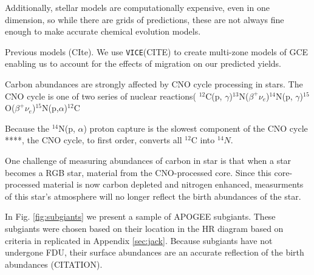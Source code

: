 \documentclass[fleqn,usenatbib]{mnras}
\newcommand{\VICE}{\texttt{VICE}}
\begin{document}
Additionally, stellar models are computationally expensive, even in one dimension, so while there are grids of predictions, these are not always fine enough to make accurate chemical evolution models. 

Previous models (CIte). We use \VICE (CITE) to create multi-zone models of GCE enabling us to account for the effects of migration on our predicted yields. 

\citet{prantzos+18}
\citep{WAF17}
\citep{james+21}
\citep{fiorenzo+21}


\citep[e.g.][]{james+22}

Carbon abundances are strongly affected by CNO cycle processing in stars. The CNO cycle is one of two series of nuclear reactions( $^{12}$C(p, $\gamma$)$^{13}$N($\beta^+ \nu_e$)$^{14}$N(p, $\gamma$)$^{15}$O($\beta^+\nu_e$)$^{15}$N(p,$\alpha$)$^{12}$C

Because the $^{14}$N(p, $\alpha$) proton capture is the slowest component of the CNO cycle ****, the CNO cycle, to first order, converts all $^{12}$C into $^{14}N$. 

One challenge of measuring abundances of carbon in star is that when a star becomes a RGB star, material from the CNO-processed core. Since this core-processed material is now carbon depleted and nitrogen enhanced, measurments of this star's atmosphere will no longer reflect the birth abundances of the star.

In Fig. \ref{fig:subgiants} we present a sample of APOGEE subgiants. These subgiants were chosen based on their location in the HR diagram based on criteria in \citet{jack_subgiant} replicated in Appendix \ref{sec:jack}. Because subgiants have not undergone FDU, their surface abundances are an accurate reflection of the birth abundances (CITATION).  
\end{document}
